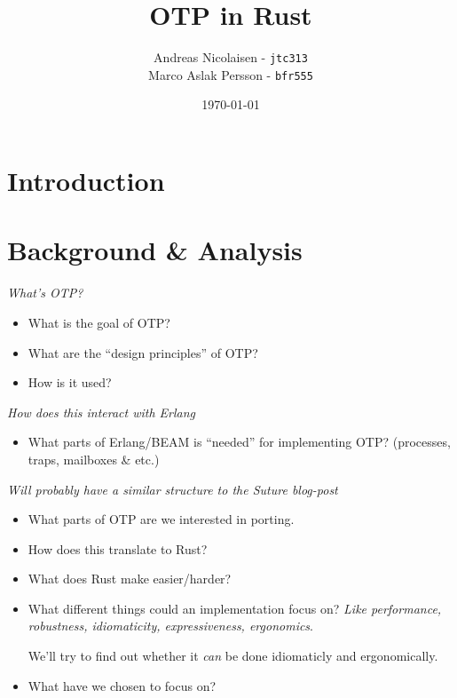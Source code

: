 \documentclass[a4paper]{article}
\title{OTP in Rust}
\author{Andreas Nicolaisen - \texttt{jtc313} \\ Marco Aslak Persson - \texttt{bfr555}}
\date{\today}
\begin{document}

\maketitle

\section{Introduction}

\section{Background \& Analysis}
\textit{What's OTP?}
\begin{itemize}
\item What is the goal of OTP?
\item What are the ``design principles'' of OTP?
\item How is it used?
\end{itemize}

\textit{How does this interact with Erlang}
\begin{itemize}
\item What parts of Erlang/BEAM is ``needed'' for implementing OTP? (processes,
  traps, mailboxes \& etc.)
\end{itemize}

\textit{Will probably have a similar structure to the Suture blog-post}
\begin{itemize}
\item What parts of OTP are we interested in porting.
\item How does this translate to Rust?
\item What does Rust make easier/harder?
\item What different things could an implementation focus on?
  \textit{Like performance, robustness, idiomaticity, expressiveness, ergonomics}.

  We'll try to find out whether it \textit{can} be done idiomaticly and ergonomically.

\item What have we chosen to focus on?
\end{itemize}
\end{document}
